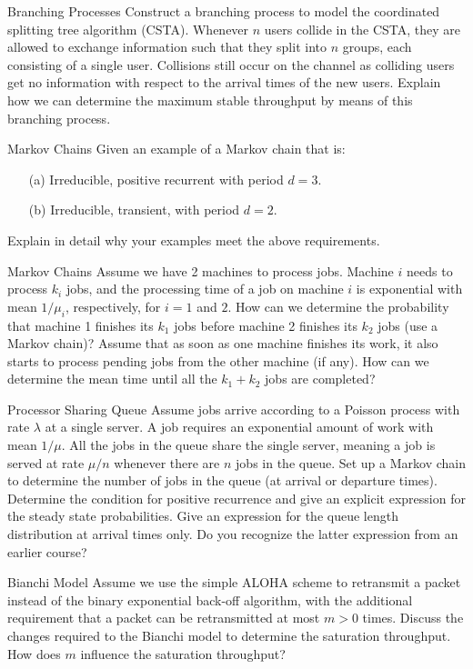 \begin{problem}{Branching Processes}
Construct a branching process to model the coordinated splitting tree algorithm (CSTA). Whenever $n$ users collide in the CSTA, they are allowed to exchange information such that they split into $n$ groups, each consisting of a single user. Collisions still occur on the channel as colliding users get no information with respect to the arrival times of the new users. Explain how we can determine the maximum stable throughput by means of this branching process.
\end{problem}

\begin{problem}{Markov Chains}
Given an example of a Markov chain that is:
\begin{itemize}
    \item[(a)] Irreducible, positive recurrent with period $d = 3$.
    \item[(b)] Irreducible, transient, with period $d = 2$.
\end{itemize}
Explain in detail why your examples meet the above requirements.
\end{problem}

\begin{problem}{Markov Chains}
Assume we have 2 machines to process jobs. Machine $i$ needs to process $k_i$ jobs, and the processing time of a job on machine $i$ is exponential with mean $1/\mu_i$, respectively, for $i = 1$ and $2$. How can we determine the probability that machine 1 finishes its $k_1$ jobs before machine 2 finishes its $k_2$ jobs (use a Markov chain)? Assume that as soon as one machine finishes its work, it also starts to process pending jobs from the other machine (if any). How can we determine the mean time until all the $k_1 + k_2$ jobs are completed?
\end{problem}

\begin{problem}{Processor Sharing Queue}
Assume jobs arrive according to a Poisson process with rate $\lambda$ at a single server. A job requires an exponential amount of work with mean $1/\mu$. All the jobs in the queue share the single server, meaning a job is served at rate $\mu/n$ whenever there are $n$ jobs in the queue. Set up a Markov chain to determine the number of jobs in the queue (at arrival or departure times). Determine the condition for positive recurrence and give an explicit expression for the steady state probabilities. Give an expression for the queue length distribution at arrival times only. Do you recognize the latter expression from an earlier course?
\end{problem}

\begin{problem}{Bianchi Model}
Assume we use the simple ALOHA scheme to retransmit a packet instead of the binary exponential back-off algorithm, with the additional requirement that a packet can be retransmitted at most $m > 0$ times. Discuss the changes required to the Bianchi model to determine the saturation throughput. How does $m$ influence the saturation throughput?
\end{problem}
